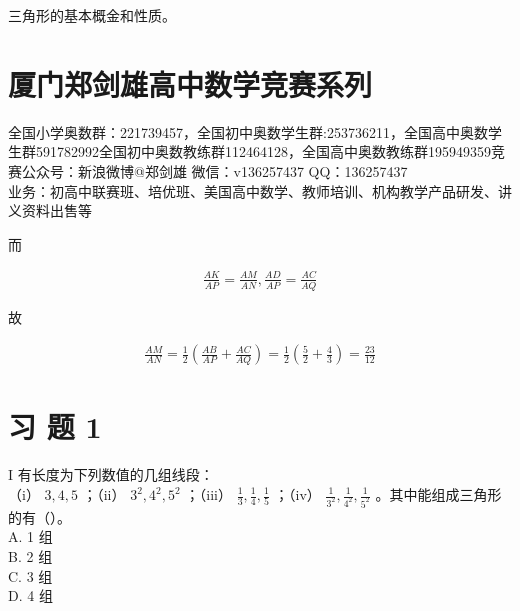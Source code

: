 \documentclass[10pt]{article}
\begin{document}
三角形的基本概金和性质。

\section*{厦门郑剑雄高中数学竞赛系列}
全国小学奥数群：221739457，全国初中奥数学生群:253736211，全国高中奥数学生群591782992全国初中奥数教练群112464128，全国高中奥数教练群195949359竞赛公众号：新浪微博@郑剑雄 微信：v136257437 QQ：136257437\\
业务：初高中联赛班、培优班、美国高中数学、教师培训、机构教学产品研发、讲义资料出售等

而

\begin{align*}
\frac{A K}{A P}=\frac{A M}{A N}, \frac{A D}{A P}=\frac{A C}{A Q}
\end{align*}

故

\begin{align*}
\frac{A M}{A N}=\frac{1}{2}\left(\frac{A B}{A P}+\frac{A C}{A Q}\right)=\frac{1}{2}\left(\frac{5}{2}+\frac{4}{3}\right)=\frac{23}{12}
\end{align*}

\section*{习 题 1}
I 有长度为下列数值的几组线段：\\
（i） $3,4,5$ ；（ii） $3^{2}, 4^{2}, 5^{2}$ ；（iii） $\frac{1}{3}, \frac{1}{4}, \frac{1}{5}$ ；（iv） $\frac{1}{3^{2}}, \frac{1}{4^{2}}, \frac{1}{5^{2}}$ 。其中能组成三角形的有（）。\\
A. 1 组\\
B. 2 组\\
C. 3 组\\
D. 4 组
\end{document}
